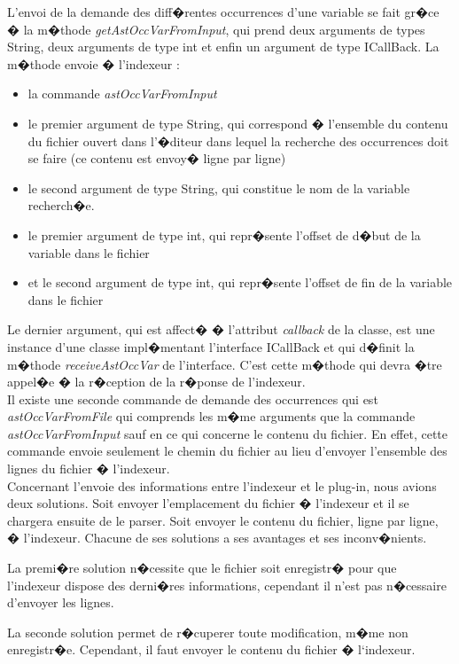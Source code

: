 \documentclass[a4paper,11pt,titlepage]{article}
\begin{document}
L'envoi de la demande des diff�rentes occurrences d'une variable se fait gr�ce � la m�thode \textit{getAstOccVarFromInput}, qui prend deux arguments de types String, deux arguments de type int et enfin un argument de type ICallBack. La m�thode envoie � l'indexeur :
 \begin{itemize}
 	\item la commande \textit{astOccVarFromInput}
	\item le premier argument de type String, qui correspond � l'ensemble du contenu du fichier ouvert dans l'�diteur dans lequel la recherche des occurrences doit se faire (ce contenu est envoy� ligne par ligne)
	\item le second argument de type String, qui constitue le nom de la variable recherch�e.
	\item le premier argument de type int, qui repr�sente l'offset de d�but de la variable dans le fichier
	\item et le second argument de type int, qui repr�sente l'offset de fin de la variable dans le fichier
\end{itemize}
Le dernier argument, qui est affect� � l'attribut \textit{callback} de la classe, est une instance d'une classe impl�mentant l'interface ICallBack et qui d�finit la m�thode \textit{receiveAstOccVar} de l'interface. C'est cette m�thode qui devra �tre appel�e � la r�ception de la r�ponse de l'indexeur.\\

Il existe une seconde commande de demande des occurrences qui est \textit{astOccVarFromFile} qui comprends les m�me arguments que la commande \textit{astOccVarFromInput} sauf en ce qui concerne le contenu du fichier. En effet, cette commande envoie seulement le chemin du fichier au lieu d'envoyer l'ensemble des lignes du fichier � l'indexeur.\\

Concernant l'envoie des informations entre l'indexeur et le plug-in, nous avions deux solutions. Soit envoyer l'emplacement du fichier � l'indexeur et il se chargera ensuite de le parser. Soit envoyer le contenu du fichier, ligne par ligne, � l'indexeur.
Chacune de ses solutions a ses avantages et ses inconv�nients. 

La premi�re solution n�cessite que le fichier soit enregistr� pour que l'indexeur dispose des derni�res informations, cependant il n'est pas n�cessaire d'envoyer les lignes. 

La seconde solution permet de r�cuperer toute modification, m�me non enregistr�e. Cependant, il faut envoyer le contenu du fichier � l`indexeur.
\end{document}
